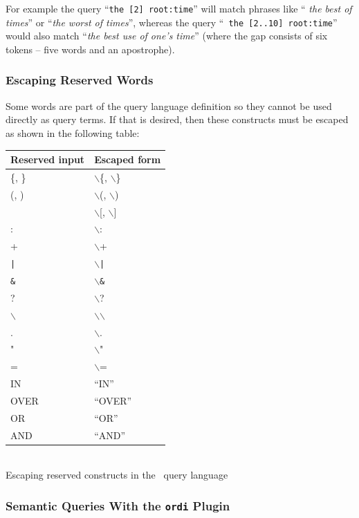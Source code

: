 For example the query ``{\tt the [2] root:time}'' will match phrases like ``{\it
the best of times}'' or ``{\it the worst of times}'', whereas the query ``{\tt
the [2..10] root:time}'' would also match ``{\it the best use of one's time}''
(where the gap consists of six tokens -- five words and an apostrophe).

\subsubsection{Escaping Reserved Words}

Some words are part of the query language definition so they cannot be used
directly as query terms. If that is desired, then these constructs must be
escaped as shown in the following table:
\begin{center}
\begin{tabular}{|l|l|}
\hline
{\bf Reserved input} & {\bf Escaped form}\\
\hline \hline
\{, \} &  $\backslash$\{, $\backslash$\}\\
\hline
(, )  & $\backslash$(, $\backslash$) \\
\hline
[, ] & $\backslash$[, $\backslash$]\\
\hline
: &  $\backslash$: \\
\hline
+ &  $\backslash$+ \\
\hline
{\tt |} &  $\backslash${\tt |} \\
\hline
{\tt \&} &  $\backslash${\tt \&} \\
\hline
? &  $\backslash$? \\
\hline
$\backslash$ &  $\backslash$$\backslash$ \\
\hline
. &  $\backslash$. \\
\hline
" &  $\backslash$" \\
\hline 
=  & $\backslash$= \\
\hline
IN & ``IN'' \\
\hline
OVER & ``OVER''\\ 
\hline
OR & ``OR''\\ 
\hline
AND & ``AND''\\ 
\hline
\end{tabular}\\
\vspace{1ex}
Escaping reserved constructs in the \Mimir\ query language
\end{center}

\subsubsection{Semantic Queries With the {\tt ordi} Plugin}

